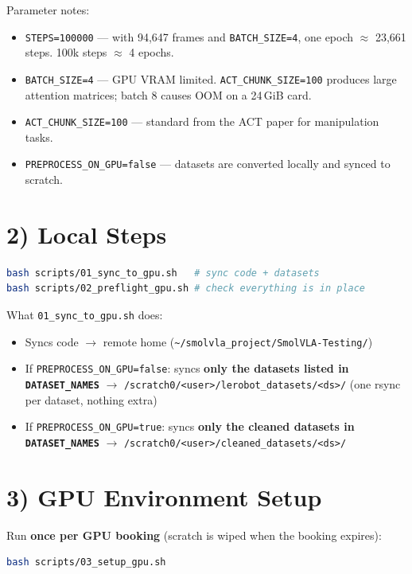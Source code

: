 \documentclass[11pt, a4paper]{article}
\begin{document}
\noindent Parameter notes:
\begin{itemize}
    \item \texttt{STEPS=100000} --- with 94,647 frames and \texttt{BATCH\_SIZE=4},
          one epoch $\approx$ 23,661 steps. 100k steps $\approx$ 4 epochs.
    \item \texttt{BATCH\_SIZE=4} --- GPU VRAM limited. \texttt{ACT\_CHUNK\_SIZE=100}
          produces large attention matrices; batch 8 causes OOM on a 24\,GiB card.
    \item \texttt{ACT\_CHUNK\_SIZE=100} --- standard from the ACT paper for
          manipulation tasks.
    \item \texttt{PREPROCESS\_ON\_GPU=false} --- datasets are converted locally
          and synced to scratch.
\end{itemize}

\section{2) Local Steps}

\begin{lstlisting}[language=bash]
bash scripts/01_sync_to_gpu.sh   # sync code + datasets
bash scripts/02_preflight_gpu.sh # check everything is in place
\end{lstlisting}

\noindent What \texttt{01\_sync\_to\_gpu.sh} does:
\begin{itemize}
    \item Syncs code $\to$ remote home (\texttt{\textasciitilde/smolvla\_project/SmolVLA-Testing/})
    \item If \texttt{PREPROCESS\_ON\_GPU=false}: syncs \textbf{only the datasets listed
          in \texttt{DATASET\_NAMES}} $\to$
          \texttt{/scratch0/<user>/lerobot\_datasets/<ds>/} (one rsync per dataset, nothing extra)
    \item If \texttt{PREPROCESS\_ON\_GPU=true}: syncs \textbf{only the cleaned datasets
          in \texttt{DATASET\_NAMES}} $\to$
          \texttt{/scratch0/<user>/cleaned\_datasets/<ds>/}
\end{itemize}

\section{3) GPU Environment Setup}

Run \textbf{once per GPU booking} (scratch is wiped when the booking expires):
\begin{lstlisting}[language=bash]
bash scripts/03_setup_gpu.sh
\end{lstlisting}
\end{document}

